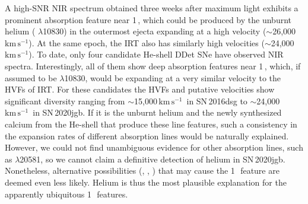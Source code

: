 \documentclass[twocolumn]{aastex631}
\newcommand{\sn}{SN\,2020jgb}
\newcommand{\kms}{$\mathrm{km}\,\mathrm{s}^{-1}$}
\begin{document}
A high-SNR NIR spectrum obtained three weeks after maximum light exhibits a prominent absorption feature near 1\,\micron, which could be produced by the unburnt helium ( $\lambda$10830) in the outermost ejecta expanding at a high velocity ($\sim$26,000\,\kms). At the same epoch, the  IRT also has similarly high velocities ($\sim$24,000\,\kms). To date, only four candidate He-shell DDet SNe have observed NIR spectra. Interestingly, all of them show deep absorption features near 1\,\micron, which, if assumed to be  $\lambda$10830, would be expanding at a very similar velocity to the HVFs of  IRT. For these candidates the  HVFs and putative  velocities show significant diversity ranging from $\sim$15,000\,\kms\ in SN\,2016dsg to $\sim$24,000\,\kms\ in \sn. If it is the unburnt helium and the newly synthesized calcium from the He-shell that produce these line features, such a consistency in the expansion rates of different absorption lines would be naturally explained. However, we could not find unambiguous evidence for other  absorption lines, such as  $\lambda$20581, so we cannot claim a definitive detection of helium in \sn. Nonetheless, alternative possibilities (, , ) that may cause the 1\,\micron\ feature are deemed even less likely. Helium is thus the most plausible explanation for the apparently ubiquitous 1\,\micron\ features.
\end{document}
